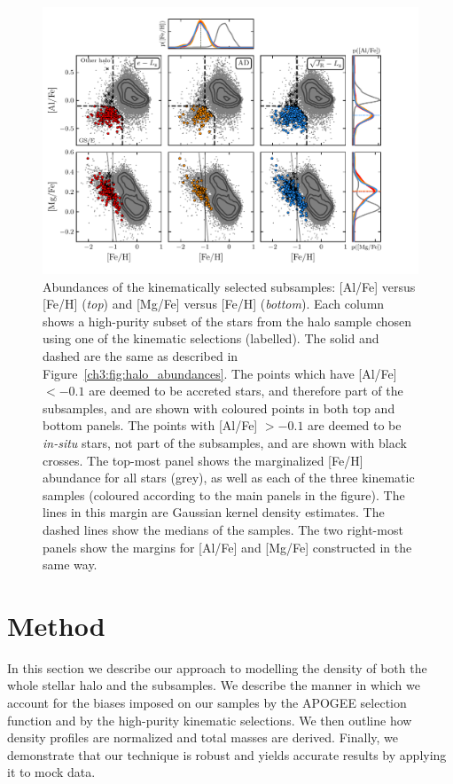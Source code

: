 \begin{figure}
    \centering
    \includegraphics[width=\textwidth]{figure/ch3/kinematic_sample_abundances.pdf}
    \caption{Abundances of the kinematically selected \gse subsamples: [Al/Fe] versus [Fe/H] (\textit{top}) and [Mg/Fe] versus [Fe/H] (\textit{bottom}). Each column shows a high-purity \gse subset of the stars from the halo sample chosen using one of the kinematic selections (labelled). The solid and dashed are the same as described in Figure~\ref{ch3:fig:halo_abundances}. The points which have [Al/Fe] $< -0.1$ are deemed to be accreted stars, and therefore part of the \gse subsamples, and are shown with coloured points in both top and bottom panels. The points with [Al/Fe] $> -0.1$ are deemed to be \textit{in-situ} stars, not part of the \gse subsamples, and are shown with black crosses. The top-most panel shows the marginalized [Fe/H] abundance for all stars (grey), as well as each of the three kinematic samples (coloured according to the main panels in the figure). The lines in this margin are Gaussian kernel density estimates. The dashed lines show the medians of the samples. The two right-most panels show the margins for [Al/Fe] and [Mg/Fe] constructed in the same way.}
    \label{ch3:fig:selection_abundances}
\end{figure}

\section{Method}
\label{ch3:sec:method}

In this section we describe our approach to modelling the density of both the whole stellar halo and the \gse subsamples. We describe the manner in which we account for the biases imposed on our samples by the APOGEE selection function and by the high-purity \gse kinematic selections. We then outline how density profiles are normalized and total masses are derived. Finally, we demonstrate that our technique is robust and yields accurate results by applying it to mock data.

